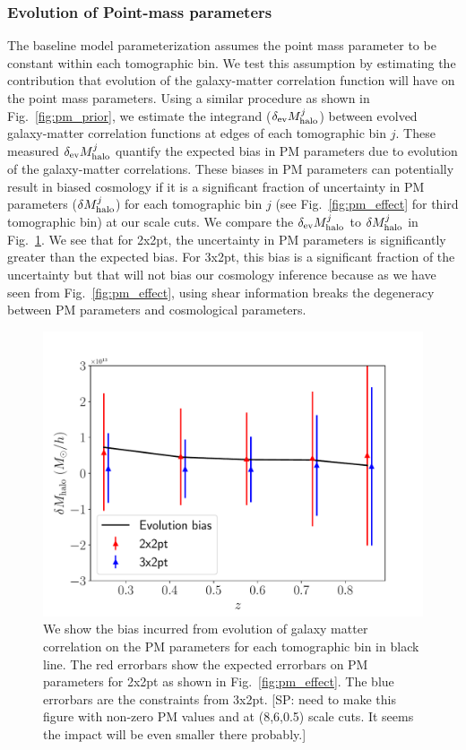 \documentclass[fleqn,usenatbib]{mnras}
\newcommand{\SP}[1]{{\color{red}[SP: #1]}}
\begin{document}
\subsubsection{Evolution of Point-mass parameters}
The baseline model parameterization assumes the point mass parameter to be constant within each tomographic bin. We test this assumption by estimating the contribution that evolution of the galaxy-matter correlation function will have on the point mass parameters. Using a similar procedure as shown in Fig.~\ref{fig:pm_prior}, we estimate the integrand ($\delta_{\rm ev} M^{j}_{\rm halo}$) between evolved galaxy-matter correlation functions at edges of each tomographic bin $j$. These measured $\delta_{\rm ev} M^{j}_{\rm halo}$ quantify the expected bias in PM parameters due to evolution of the galaxy-matter correlations. These biases in PM parameters can potentially result in biased cosmology if it is a significant fraction of uncertainty in PM parameters ($\delta M^{j}_{\rm halo}$) for each tomographic bin $j$ (see Fig.~\ref{fig:pm_effect} for third tomographic bin) at our scale cuts. We compare the $\delta_{\rm ev} M^{j}_{\rm halo}$ to $\delta M^{j}_{\rm halo}$ in Fig.~\ref{fig:pm_evolve}. We see that for 2x2pt, the uncertainty in PM parameters is significantly greater than the expected bias. For 3x2pt, this bias is a significant fraction of the uncertainty but that will not bias our cosmology inference because as we have seen from Fig.~\ref{fig:pm_effect}, using shear information breaks the degeneracy between PM parameters and cosmological parameters.


\begin{figure}
\includegraphics[width=\columnwidth]{figs/PM_evolve_impact.pdf}
\caption[]{We show the bias incurred from evolution of galaxy matter correlation on the PM parameters for each tomographic bin in black line. The red errorbars show the expected errorbars on PM parameters for 2x2pt as shown in Fig.~\ref{fig:pm_effect}. The blue errorbars are the constraints from 3x2pt. \SP{need to make this figure with non-zero PM values and at (8,6,0.5) scale cuts. It seems the impact will be even smaller there probably.}
}
\label{fig:pm_evolve}
\end{figure}
\end{document}
